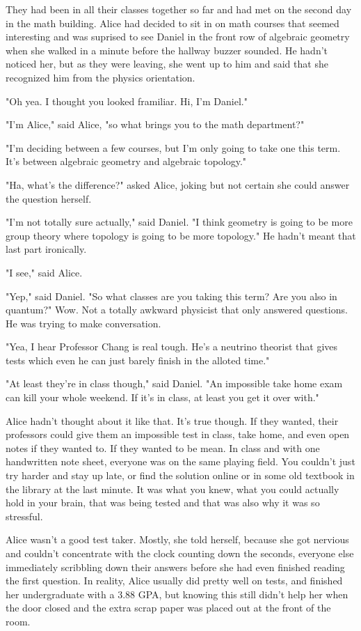 \mypause

They had been in all their classes together so far and had met on the second day in the math building. Alice had decided to sit in on math courses that seemed interesting and was suprised to see Daniel in the front row of algebraic geometry when she walked in a minute before the hallway buzzer sounded. He hadn't noticed her, but as they were leaving, she went up to him and said that she recognized him from the physics orientation. 

"Oh yea. I thought you looked framiliar. Hi, I'm Daniel."

"I'm Alice," said Alice, "so what brings you to the math department?"

"I'm deciding between a few courses, but I'm only going to take one this term. It's between algebraic geometry and algebraic topology."

"Ha, what's the difference?" asked Alice, joking but not certain she could answer the question herself.

"I'm not totally sure actually," said Daniel. "I think geometry is going to be more group theory where topology is going to be more topology." He hadn't meant that last part ironically.

"I see," said Alice.

"Yep," said Daniel. "So what classes are you taking this term? Are you also in quantum?" Wow. Not a totally awkward physicist that only answered questions. He was trying to make conversation.

"Yea, I hear Professor Chang is real tough. He's a neutrino theorist that gives tests which even he can just barely finish in the alloted time."

"At least they're in class though," said Daniel. "An impossible take home exam can kill your whole weekend. If it's in class, at least you get it over with."

Alice hadn't thought about it like that. It's true though. If they wanted, their professors could give them an impossible test in class, take home, and even open notes if they wanted to. If they wanted to be mean. In class and with one handwritten note sheet, everyone was on the same playing field. You couldn't just try harder and stay up late, or find the solution online or in some old textbook in the library at the last minute. It was what you knew, what you could actually hold in your brain, that was being tested and that was also why it was so stressful.

Alice wasn't a good test taker. Mostly, she told herself, because she got nervious and couldn't concentrate with the clock counting down the seconds, everyone else immediately scribbling down their answers before she had even finished reading the first question. In reality, Alice usually did pretty well on tests, and finished her undergraduate with a 3.88 GPA, but knowing this still didn't help her when the door closed and the extra scrap paper was placed out at the front of the room.

